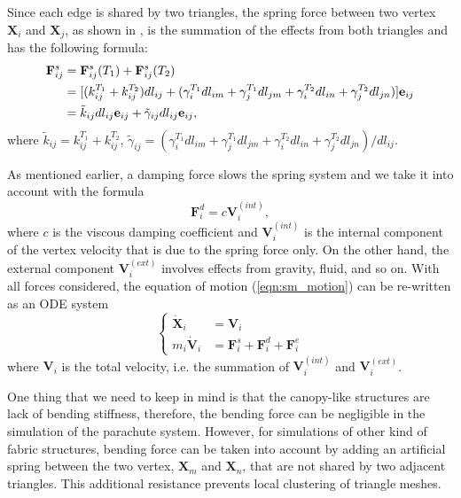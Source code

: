 Since each edge is shared by two triangles, the spring force between two vertex
$\mathbf{X}_i$ and $\mathbf{X}_j$, as shown in , is the
summation of the effects from both triangles and has
the following formula:
\begin{align}
\mathbf{F}_{ij}^{s} &= \mathbf{F}_{ij}^{s}(T_1) + \mathbf{F}_{ij}^{s}(T_2) \notag \\
&= [(k_{ij}^{T_1} + k_{ij}^{T_2})dl_{ij} + (\gamma_{i}^{T_1}dl_{im} + \gamma_{j}^{T_1}dl_{jm} + \gamma_{i}^{T_2}dl_{in} + \gamma_{j}^{T_2}dl_{jn})]\mathbf{e}_{ij} \notag \\ 
&= \tilde{k}_{ij}dl_{ij}\mathbf{e}_{ij} + \tilde{\gamma}_{ij}dl_{ij}\mathbf{e}_{ij},
\label{eqn:sm_force_new}
\end{align}
where $\tilde{k}_{ij} = k_{ij}^{T_1}+k_{ij}^{T_2}$, $\tilde{\gamma}_{ij} = 
(\gamma_{i}^{T_1}dl_{im} + \gamma_{j}^{T_1}dl_{jm} + \gamma_{i}^{T_2}dl_{in} + 
\gamma_{j}^{T_2}dl_{jn})/dl_{ij}$.

As mentioned earlier, a damping force slows the spring system and we take it
into account with the formula
\begin{equation}
\mathbf{F}_{i}^{d} = c \mathbf{V}_{i}^{(int)},
\label{eqn:damp_force}
\end{equation}
where $c$ is the viscous damping coefficient and $\mathbf{V}_{i}^{(int)}$ is
the internal component of the vertex velocity that is due to the spring force
only.
On the other hand, the external component $\mathbf{V}_{i}^{(ext)}$ involves
effects from gravity, fluid, and so on.
With all forces considered, the equation of motion (\ref{eqn:sm_motion}) can
be re-written as an ODE system
\begin{equation}
\left\{
\begin{aligned}
\dot{\mathbf{X}}_{i} &= \mathbf{V}_{i} \\
m_{i} \dot{\mathbf{V}}_{i} &= \mathbf{F}_{i}^{s} + \mathbf{F}_{i}^{d} + \mathbf{F}_{i}^{e}
\end{aligned}
\right.
\label{eqn:sm_ODEs}
\end{equation}
where $\mathbf{V}_{i}$ is the total velocity, i.e. the summation of
$\mathbf{V}_{i}^{(int)}$ and $\mathbf{V}_{i}^{(ext)}$.

One thing that we need to keep in mind is that the canopy-like structures
are lack of bending stiffness, therefore, the bending force can be negligible
in the simulation of the parachute system.
However, for simulations of other kind of fabric structures, bending force
can be taken into account by adding an artificial spring between the two
vertex, $\mathbf{X}_{m}$ and $\mathbf{X}_{n}$, that are not shared by two 
adjacent triangles.
This additional resistance prevents local clustering of triangle meshes.



